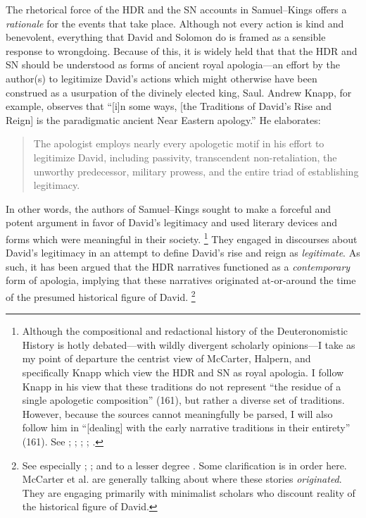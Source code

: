 The rhetorical force of the HDR and the SN accounts in Samuel--Kings offers a \emph{rationale} for the events that take place. Although not every action is kind and benevolent, everything that David and Solomon do is framed as a sensible response to wrongdoing. Because of this, it is widely held that that the HDR and SN should be understood as forms of ancient royal apologia---an effort by the author(s) to legitimize David's actions which might otherwise have been construed as a usurpation of the divinely elected king, Saul. Andrew Knapp, for example, observes that ``[i]n some ways, [the Traditions of David's Rise and Reign] is the paradigmatic ancient Near Eastern apology.''%
    \autocite[218]{knapp2015}
He elaborates:
\begin{quote}
    The apologist employs nearly every apologetic motif in his effort to legitimize David, including passivity, transcendent non-retaliation, the unworthy predecessor, military prowess, and the entire triad of establishing legitimacy.%
\autocite{knapp2015}
\end{quote}
\noindent
In other words, the authors of Samuel--Kings sought to make a forceful and potent argument in favor of David's legitimacy and used literary devices and forms which were meaningful in their society.%
    \footnote{Although the compositional and redactional history of the Deuteronomistic History is hotly debated---with wildly divergent scholarly opinions---I take as my point of departure the centrist view of McCarter, Halpern, and specifically Knapp which view the HDR and SN as royal apologia. I follow Knapp in his view that these traditions do not represent ``the residue of a single apologetic composition'' (161), but rather a diverse set of traditions. However, because the sources cannot meaningfully be parsed, I will also follow him in ``[dealing] with the early narrative traditions in their entirety'' (161). See 
        \cite{knapp2015};
        \cite{mccarter_interpretation1981};
        \cite{mccarter_jbl1980};
        \cite{mccarter1980};
        \cite{halpern2001}.}
They engaged in discourses about David's legitimacy in an attempt to define David's rise and reign as \emph{legitimate}. As such, it has been argued that the HDR narratives functioned as a \emph{contemporary} form of apologia, implying that these narratives originated at-or-around the time of the presumed historical figure of David.%
    \footnote{See especially \cite{mccarter_interpretation1981}; \cite{mccarter_jbl1980}; and to a lesser degree \cite[75--76]{halpern2001}. Some clarification is in order here. McCarter et al. are generally talking about where these stories \emph{originated}. They are engaging primarily with minimalist scholars who discount reality of the historical figure of David.}
